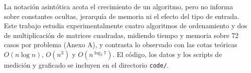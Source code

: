 La notación asintótica acota el crecimiento de un algoritmo, pero no informa
sobre constantes ocultas, jerarquía de memoria ni el efecto del tipo de
entrada. Este trabajo estudia experimentalmente cuatro algoritmos de
ordenamiento y dos de multiplicación de matrices cuadradas, midiendo tiempo y
memoria sobre 72 casos por problema (Anexo A), y contrasta lo observado con las
cotas teóricas $O(n\log n)$, $O(n^3)$ y $O(n^{\log_2 7})$. El código, los datos
y los scripts de medición y graficado se incluyen en el directorio \texttt{code/}.